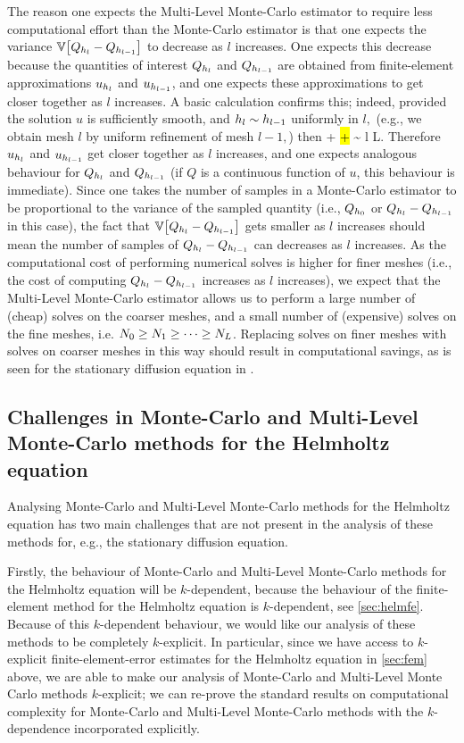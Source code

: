 The reason one expects the Multi-Level Monte-Carlo estimator to require less computational effort than the Monte-Carlo estimator is that one expects the variance $\VAR{\Qhl-\Qhlmo}$ to decrease as $l$ increases. One expects this decrease because the quantities of interest $Q_{h_{l}}$ and $Q_{h_{l-1}}$ are obtained from finite-element approximations $u_{h_{l}}$ and $u_{h_{l-1}}$, and one expects these approximations to get closer together as $l$ increases. A basic calculation confirms this; indeed, provided the solution $u$ is sufficiently smooth, and $h_{l} \sim h_{l-1}$ uniformly in $l,$ (e.g., we obtain mesh $l$ by uniform refinement of mesh $l-1,$) then
\beqs
\NHo{\uhl - \uhlmo} \leq {} +  \lesssim \hl + \hlmo \sim \hlmo {}  l \rightarrow L.
\eeqs
Therefore $u_{h_{l}}$ and $u_{h_{l-1}}$ get closer together as $l$ increases, and one expects analogous behaviour for $Q_{h_{l}}$ and $Q_{h_{l-1}}$ (if $Q$ is a continuous function of $u$, this behaviour is immediate). Since one takes the number of samples in a Monte-Carlo estimator to be proportional to the variance of the sampled quantity (i.e., $Q_{h_{0}}$ or $Q_{h_{l}}-Q_{h_{l-1}}$ in this case), the fact that $\VAR{\Qhl-\Qhlmo}$ gets smaller as $l$ increases should mean the number of samples of $Q_{h_{l}}-Q_{h_{l-1}}$ can decreases as $l$ increases. As the computational cost of performing numerical solves is higher for finer meshes (i.e., the cost of computing $Q_{h_{l}}-Q_{h_{l-1}}$ increases as $l$ increases), we expect that the Multi-Level Monte-Carlo estimator allows us to perform a large number of (cheap) solves on the coarser meshes, and a small number of (expensive) solves on the fine meshes, i.e. $N_{0} \geq N_{1} \geq \cdots \geq N_{L}$. Replacing solves on finer meshes with solves on coarser meshes in this way should result in computational savings, as is seen for the stationary diffusion equation in \cite{ClGiScTe:11}.

\subsection{Challenges in Monte-Carlo and Multi-Level Monte-Carlo methods for the Helmholtz equation}\label{sec:mlmcchallenges}

Analysing Monte-Carlo and Multi-Level Monte-Carlo methods for the Helmholtz equation has two main challenges that are not present in the analysis of these methods for, e.g., the stationary diffusion equation.

Firstly, the behaviour of Monte-Carlo and Multi-Level Monte-Carlo methods for the Helmholtz equation will be $k$-dependent, because the behaviour of the finite-element method for the Helmholtz equation is $k$-dependent, see \cref{sec:helmfe}. Because of this $k$-dependent behaviour, we would like our analysis of these methods to be completely $k$-explicit. In particular, since we have access to $k$-explicit finite-element-error estimates for the Helmholtz equation in \cref{sec:fem} above, we are able to make our analysis of Monte-Carlo and Multi-Level Monte Carlo methods $k$-explicit; we can re-prove the standard results on computational complexity for Monte-Carlo and Multi-Level Monte-Carlo methods with the $k$-dependence incorporated explicitly.

